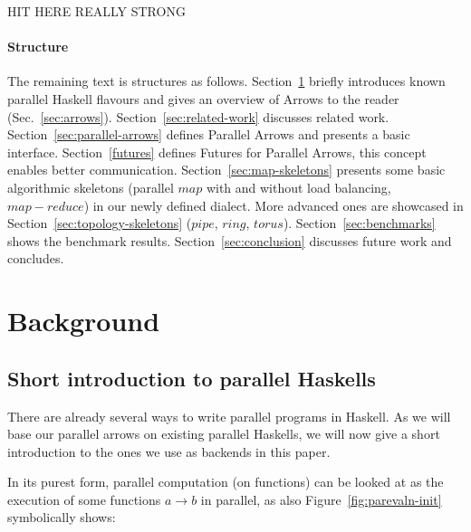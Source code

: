 \documentclass{jfp1}
\newcommand{\Varid}[1]{\mathit{#1}}
\def\resethooks{%
  \global\let\SaveRestoreHook\empty
  \global\let\ColumnHook\empty}
\let\hspre\empty
\let\hspost\empty
\begin{document}
HIT HERE REALLY STRONG

\paragraph{Structure}
The remaining text is structures as follows. Section~\ref{sec:background} briefly introduces known parallel Haskell flavours and gives an overview of Arrows to the reader (Sec.~\ref{sec:arrows}). Section~\ref{sec:related-work} discusses related work. Section~\ref{sec:parallel-arrows} defines Parallel Arrows and presents a basic interface. Section~\ref{futures} defines Futures for Parallel Arrows, this concept enables better communication. Section~\ref{sec:map-skeletons} presents some basic algorithmic skeletons (parallel \ensuremath{\Varid{map}} with and without load balancing, \ensuremath{\Varid{map}\mathbin{-}\Varid{reduce}}) in our newly defined dialect. More advanced ones are showcased in Section~\ref{sec:topology-skeletons} (\ensuremath{\Varid{pipe}}, \ensuremath{\Varid{ring}}, \ensuremath{\Varid{torus}}). Section~\ref{sec:benchmarks} shows the benchmark results. Section~\ref{sec:conclusion} discusses future work and concludes.

	\section{Background}
\label{sec:background}
\subsection{Short introduction to parallel Haskells}
There are already several ways to write parallel programs in Haskell. As we will base our parallel arrows on existing parallel Haskells, we will now give a short introduction to the ones we use as backends in this paper.

In its purest form, parallel computation (on functions) can be looked at as the execution of some functions \ensuremath{\Varid{a}\to \Varid{b}} in parallel, as also Figure~\ref{fig:parevaln-init} symbolically shows:

\resethooks
\end{document}
